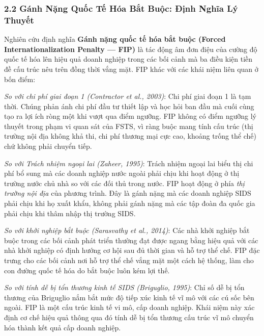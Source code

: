 \documentclass[12pt,a4paper]{article}
\begin{document}
\hypertarget{22-guxe1nh-nux1eb7ng-quux1ed1c-tux1ebf-huxf3a-bux1eaft-buux1ed9c-ux111ux1ecbnh-nghux129a-luxfd-thuyux1ebft}{%
\subsubsection{2.2 Gánh Nặng Quốc Tế Hóa Bắt Buộc: Định Nghĩa Lý
Thuyết}\label{22-guxe1nh-nux1eb7ng-quux1ed1c-tux1ebf-huxf3a-bux1eaft-buux1ed9c-ux111ux1ecbnh-nghux129a-luxfd-thuyux1ebft}}

Nghiên cứu định nghĩa \textbf{Gánh nặng quốc tế hóa bắt buộc (Forced
Internationalization Penalty --- FIP)} là tác động âm đơn điệu của cường
độ quốc tế hóa lên hiệu quả doanh nghiệp trong các bối cảnh mà ba điều
kiện tiền đề cấu trúc nêu trên đồng thời vắng mặt. FIP khác với các khái
niệm liên quan ở bốn điểm:

\emph{So với chi phí giai đoạn 1 (Contractor et al., 2003)}: Chi phí
giai đoạn 1 là tạm thời. Chúng phản ánh chi phí đầu tư thiết lập và học
hỏi ban đầu mà cuối cùng tạo ra lợi ích ròng một khi vượt qua điểm
ngưỡng. FIP không có điểm ngưỡng lý thuyết trong phạm vi quan sát của
FSTS, vì ràng buộc mang tính cấu trúc (thị trường nội địa không khả thi,
chi phí thương mại cực cao, khoảng trống thể chế) chứ không phải chuyển
tiếp.

\emph{So với Trách nhiệm ngoại lai (Zaheer, 1995)}: Trách nhiệm ngoại
lai biểu thị chi phí bổ sung mà các doanh nghiệp nước ngoài phải chịu
khi hoạt động ở thị trường nước chủ nhà so với các đối thủ trong nước.
FIP hoạt động ở phía \emph{thị trường nội địa} của phương trình. Đây là
gánh nặng mà các doanh nghiệp SIDS phải chịu khi họ xuất khẩu, không
phải gánh nặng mà các tập đoàn đa quốc gia phải chịu khi thâm nhập thị
trường SIDS.

\emph{So với khởi nghiệp bắt buộc (Sarasvathy et al., 2014)}: Các nhà
khởi nghiệp bắt buộc trong các bối cảnh phát triển thường đạt được ngang
bằng hiệu quả với các nhà khởi nghiệp có định hướng cơ hội sau đủ thời
gian và hỗ trợ thể chế. FIP đặc trưng cho các bối cảnh nơi hỗ trợ thể
chế vắng mặt một cách hệ thống, làm cho con đường quốc tế hóa do bắt
buộc luôn kém lợi thế.

\emph{So với tính dễ bị tổn thương kinh tế SIDS (Briguglio, 1995)}: Chỉ
số dễ bị tổn thương của Briguglio nắm bắt mức độ tiếp xúc kinh tế vĩ mô
với các cú sốc bên ngoài. FIP là một cấu trúc kinh tế vi mô, cấp doanh
nghiệp. Khái niệm này xác định cơ chế hiệu quả thông qua đó tính dễ bị
tổn thương cấu trúc vĩ mô chuyển hóa thành kết quả cấp doanh nghiệp.
\end{document}

